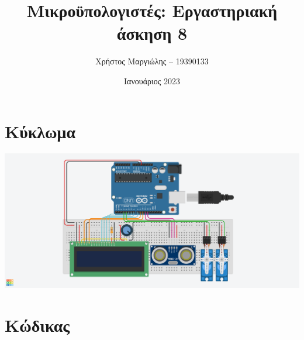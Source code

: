 \documentclass{article}
\title{Μικροϋπολογιστές: Εργαστηριακή άσκηση 8}
\author{Χρήστος Μαργιώλης -- 19390133}
\date{Ιανουάριος 2023}
\begin{document}
\begin{titlepage}
        \maketitle
\end{titlepage}

\section{Κύκλωμα}

\includegraphics[width=\linewidth]{radar.png}
\pagebreak

\section{Κώδικας}


\end{document}
